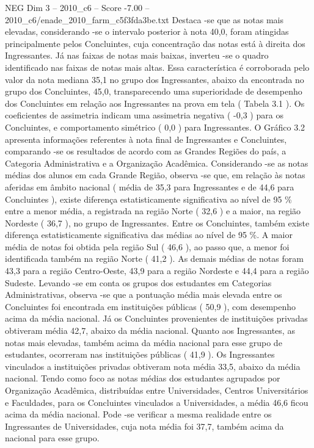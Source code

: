 \begin{textsample}{NEG Dim 3 – 2010\_c6 – Score -7.00 – 2010\_c6/enade\_2010\_farm\_c5f3fda3be.txt}
Destaca -se que as notas mais elevadas, considerando -se o intervalo posterior à nota 40,0, foram atingidas principalmente pelos Concluintes, cuja concentração das notas está à direita dos Ingressantes.
Já nas faixas de notas mais baixas, inverteu -se o quadro identificado nas faixas de notas mais altas.
Essa característica é corroborada pelo valor da nota mediana 35,1 no grupo dos Ingressantes, abaixo da encontrada no grupo dos Concluintes, 45,0, transparecendo uma superioridade de desempenho dos Concluintes em relação aos Ingressantes na prova em tela ( Tabela 3.1 ).
Os coeficientes de assimetria indicam uma assimetria negativa ( -0,3 ) para os Concluintes, e comportamento simétrico ( 0,0 ) para Ingressantes.
O Gráfico 3.2 apresenta informações referentes à nota final de Ingressantes e Concluintes, comparando -se os resultados de acordo com as Grandes Regiões do país, a Categoria Administrativa e a Organização Acadêmica.
Considerando -se as notas médias dos alunos em cada Grande Região, observa -se que, em relação às notas aferidas em âmbito nacional ( média de 35,3 para Ingressantes e de 44,6 para Concluintes ), existe diferença estatisticamente significativa ao nível de 95 \% entre a menor média, a registrada na região Norte ( 32,6 ) e a maior, na região Nordeste ( 36,7 ), no grupo de Ingressantes.
Entre os Concluintes, também existe diferença estatisticamente significativa das médias ao nível de 95 \%.
A maior média de notas foi obtida pela região Sul ( 46,6 ), ao passo que, a menor foi identificada também na região Norte ( 41,2 ).
As demais médias de notas foram 43,3 para a região Centro-Oeste, 43,9 para a região Nordeste e 44,4 para a região Sudeste.
Levando -se em conta os grupos dos estudantes em Categorias Administrativas, observa -se que a pontuação média mais elevada entre os Concluintes foi encontrada em instituições públicas ( 50,9 ), com desempenho acima da média nacional.
Já os Concluintes provenientes de instituições privadas obtiveram média 42,7, abaixo da média nacional.
Quanto aos Ingressantes, as notas mais elevadas, também acima da média nacional para esse grupo de estudantes, ocorreram nas instituições públicas ( 41,9 ).
Os Ingressantes vinculados a instituições privadas obtiveram nota média 33,5, abaixo da média nacional.
Tendo como foco as notas médias dos estudantes agrupados por Organização Acadêmica, distribuídas entre Universidades, Centros Universitários e Faculdades, para os Concluintes vinculados a Universidades, a média 46,6 ficou acima da média nacional.
Pode -se verificar a mesma realidade entre os Ingressantes de Universidades, cuja nota média foi 37,7, também acima da nacional para esse grupo.

\end{textsample}
